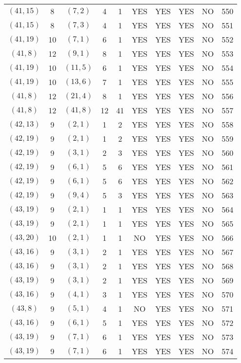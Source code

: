 \begin{longtable}{|c|c|c|c|c|c|c|c|c|c|}
$(41, 15)$ & 8 & $(7, 2)$ & 4 & 1 & YES & YES & YES & NO & 550\\
$(41, 15)$ & 8 & $(7, 3)$ & 4 & 1 & YES & YES & YES & NO & 551\\
$(41, 19)$ & 10 & $(7, 1)$ & 6 & 1 & YES & YES & YES & NO & 552\\
$(41, 8)$ & 12 & $(9, 1)$ & 8 & 1 & YES & YES & YES & NO & 553\\
$(41, 19)$ & 10 & $(11, 5)$ & 6 & 1 & YES & YES & YES & NO & 554\\
$(41, 19)$ & 10 & $(13, 6)$ & 7 & 1 & YES & YES & YES & NO & 555\\
$(41, 8)$ & 12 & $(21, 4)$ & 8 & 1 & YES & YES & YES & NO & 556\\
$(41, 8)$ & 12 & $(41, 8)$ & 12 & 41 & YES & YES & YES & NO & 557\\
$(42, 13)$ & 9 & $(2, 1)$ & 1 & 2 & YES & YES & YES & NO & 558\\
$(42, 19)$ & 9 & $(2, 1)$ & 1 & 2 & YES & YES & YES & NO & 559\\
$(42, 19)$ & 9 & $(3, 1)$ & 2 & 3 & YES & YES & YES & NO & 560\\
$(42, 19)$ & 9 & $(6, 1)$ & 5 & 6 & YES & YES & YES & NO & 561\\
$(42, 19)$ & 9 & $(6, 1)$ & 5 & 6 & YES & YES & YES & NO & 562\\
$(42, 19)$ & 9 & $(9, 4)$ & 5 & 3 & YES & YES & YES & NO & 563\\
$(43, 19)$ & 9 & $(2, 1)$ & 1 & 1 & YES & YES & YES & NO & 564\\
$(43, 19)$ & 9 & $(2, 1)$ & 1 & 1 & YES & YES & YES & NO & 565\\
$(43, 20)$ & 10 & $(2, 1)$ & 1 & 1 & NO & YES & YES & NO & 566\\
$(43, 16)$ & 9 & $(3, 1)$ & 2 & 1 & YES & YES & YES & NO & 567\\
$(43, 16)$ & 9 & $(3, 1)$ & 2 & 1 & YES & YES & YES & NO & 568\\
$(43, 19)$ & 9 & $(3, 1)$ & 2 & 1 & YES & YES & YES & NO & 569\\
$(43, 16)$ & 9 & $(4, 1)$ & 3 & 1 & YES & YES & YES & NO & 570\\
$(43, 8)$ & 9 & $(5, 1)$ & 4 & 1 & NO & YES & YES & NO & 571\\
$(43, 16)$ & 9 & $(6, 1)$ & 5 & 1 & YES & YES & YES & NO & 572\\
$(43, 19)$ & 9 & $(7, 1)$ & 6 & 1 & YES & YES & YES & NO & 573\\
$(43, 19)$ & 9 & $(7, 1)$ & 6 & 1 & YES & YES & YES & NO & 574\\

\end{longtable}

